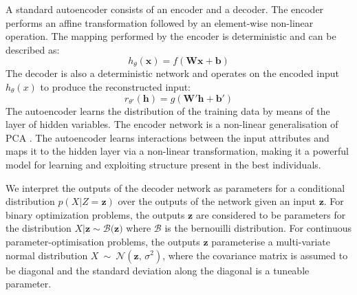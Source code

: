 \documentclass[runningheads,a4paper]{llncs}
\begin{document}



A standard autoencoder consists of an encoder and a decoder. The encoder performs an affine transformation followed by an element-wise non-linear operation. The mapping performed by the encoder is deterministic and can be described as: $$h_{\theta}(\mathbf{x}) = f(\mathbf{Wx + b})$$ The decoder is also a deterministic network and operates on the encoded input $h_{\theta}(x)$ to produce the reconstructed input: $$ r_{\theta'}(\mathbf{h}) = g(\mathbf{W'h + b'})$$ The autoencoder learns the distribution of the training data by means of the layer of hidden variables. The encoder network is a non-linear generalisation of PCA \cite{hinton2006reducing}. The autoencoder learns interactions between the input attributes and maps it to the hidden layer via a non-linear transformation, making it a powerful model for learning and exploiting structure present in the best individuals.

We interpret the outputs of the decoder network as parameters for a conditional distribution $p(X|Z=\mathbf{z})$ over the outputs of the network given an input $\mathbf{z}$. For binary optimization problems, the outputs $\mathbf{z}$ are considered to be parameters for the distribution $X|\mathbf{z} \sim \mathcal{B(\mathbf{z}})$ where $\mathcal{B}$ is the bernouilli distribution. For continuous parameter-optimisation problems, the outputs $\mathbf z$ parameterise a multi-variate normal distribution $X\ \sim\ \mathcal{N}(\mathbf{z},\,\sigma^2)$, where the covariance matrix is assumed to be diagonal and the standard deviation along the diagonal is a tuneable parameter.
\end{document}
